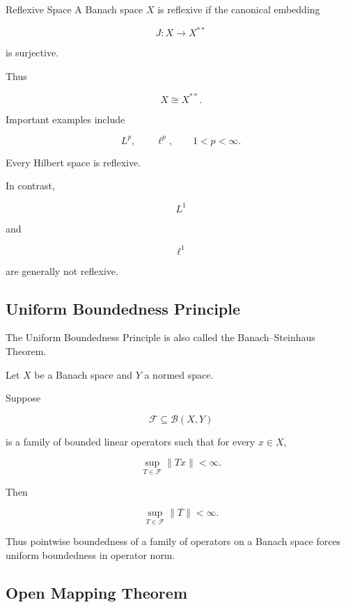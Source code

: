\begin{definitionbox}{Reflexive Space}
A Banach space \(X\) is reflexive if the canonical embedding

\[
J:X\to X^{**}
\]

is surjective.
\end{definitionbox}

Thus

\[
\boxed{
X\cong X^{**}.
}
\]

Important examples include

\[
\boxed{
L^p,
\qquad
\ell^p,
\qquad
1<p<\infty.
}
\]

Every Hilbert space is reflexive.

In contrast,

\[
L^1
\]

and

\[
\ell^1
\]

are generally not reflexive.

\subsection{Uniform Boundedness Principle}
\label{subsec:uniform-boundedness-principle}

The Uniform Boundedness Principle is also called the Banach--Steinhaus
Theorem.

\begin{theorem}
Let \(X\) be a Banach space and \(Y\) a normed space.

Suppose

\[
\mathcal{F}\subseteq\mathcal{B}(X,Y)
\]

is a family of bounded linear operators such that for every \(x\in X\),

\[
\boxed{
\sup_{T\in\mathcal{F}}\|Tx\|<\infty.
}
\]

Then

\[
\boxed{
\sup_{T\in\mathcal{F}}\|T\|<\infty.
}
\]
\end{theorem}

Thus pointwise boundedness of a family of operators on a Banach space
forces uniform boundedness in operator norm.

\subsection{Open Mapping Theorem}
\label{subsec:open-mapping-functional}

